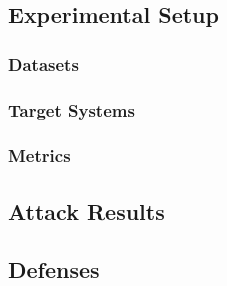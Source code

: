 \placeholder

\subsection{Experimental Setup}
\placeholder

\subsubsection{Datasets}
\placeholder

\subsubsection{Target Systems}
\placeholder

\subsubsection{Metrics}
\placeholder

\subsection{Attack Results}
\placeholder

\subsection{Defenses}
\placeholder

